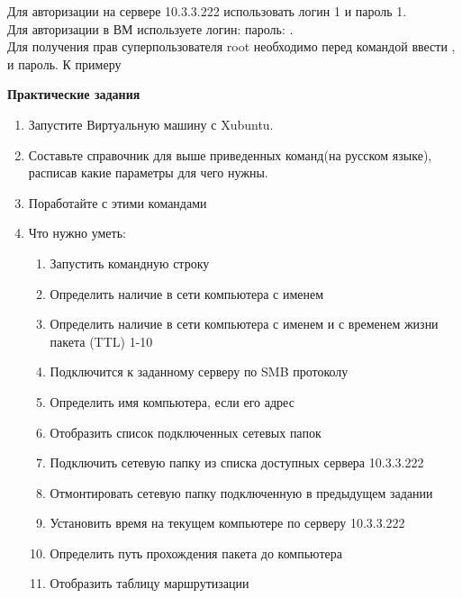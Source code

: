 \documentclass[a4paper,12pt]{article}
\begin{document}
  \begin{flushleft}
   Для авторизации на сервере 10.3.3.222 использовать логин 1 и пароль 1. \\[0.5em]
   Для авторизации в ВМ используете логин:  пароль: . \\[0.5em]
   Для получения прав суперпользователя root необходимо перед командой ввести , и пароль. К примеру 
  \end{flushleft}


  \newpage

  \begin{center}
    {\bf Практические задания}
  \end{center}

  \begin{flushleft}
    \begin{enumerate} [1. ]
     \item Запустите Виртуальную машину с Xubuntu.
     \item Составьте справочник для выше приведенных команд(на русском языке), расписав какие параметры для чего нужны.
     \item Поработайте с этими командами
     \item Что нужно уметь:
      \begin{enumerate} [\bf a. ]
        \item Запустить командную строку
        \item Определить наличие в сети компьютера с именем 
        \item Определить наличие в сети компьютера с именем  и с временем жизни пакета (TTL) 1-10
        \item Подключится к заданному серверу  по SMB протоколу
        \item Определить имя компьютера, если его адрес 
        \item Отобразить список подключенных сетевых папок
        \item Подключить сетевую папку из списка доступных сервера 10.3.3.222
        \item Отмонтировать сетевую папку подключенную в предыдущем задании
        \item Установить время на текущем компьютере по серверу 10.3.3.222
        \item Определить путь прохождения пакета до компьютера 
        \item Отобразить таблицу маршрутизации

\end{enumerate}
\end{enumerate}
\end{flushleft}
\end{document}
